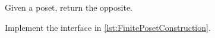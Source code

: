 
\begin{codeexercise}
    Given a poset, return the opposite.

    Implement the interface in \cref{lst:FinitePosetConstruction}.
\end{codeexercise}

